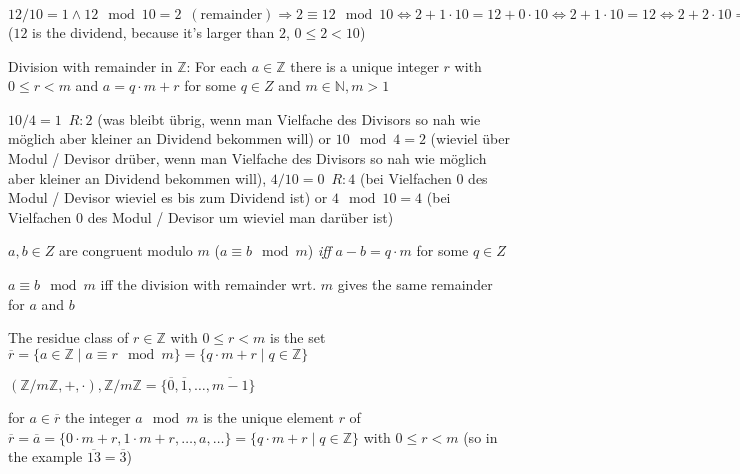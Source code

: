 \documentclass[landscape, a4paper]{article}
\begin{document}
\begin{minipage}[t]{0.2\linewidth}
	\begin{betterlist}
		\item $\boxed{12 / 10 = 1 \wedge 12 \mod 10 = 2 \enspace(\text{remainder})} \Rightarrow 2 \equiv 12 \mod 10 \Leftrightarrow 2 + 1 \cdot 10 = 12 + 0 \cdot 10 \Leftrightarrow \boxed{2 + 1 \cdot 10 = 12}\Leftrightarrow 2 + 2 \cdot 10 = 12 + 1 \cdot 10$ ($12$ is the dividend, because it's larger than $2$, $0\le 2< 10$)
		\item \alert{Division with remainder in $\mathbb{Z}$:} For each $a \in \mathbb{Z}$ there is a unique integer $r$ with $0 \le r < m$ and $a = q \cdot m + r$ for some $q \in Z$ and $m \in \mathbb{N}, m > 1$
		\begin{betterlist}
			\item $10 / 4 = 1\enspace R:2$ (was bleibt übrig, wenn man Vielfache des Divisors so nah wie möglich aber kleiner an Dividend bekommen will) or $10 \mod 4 = 2$ (wieviel über Modul / Devisor drüber, wenn man Vielfache des Divisors so nah wie möglich aber kleiner an Dividend bekommen will), $4 / 10 = 0\enspace R:4$ (bei Vielfachen $0$ des Modul / Devisor  wieviel es bis zum Dividend ist) or $4 \mod 10 = 4$ (bei Vielfachen $0$ des Modul / Devisor um wieviel man darüber ist)
		\end{betterlist}
		\item $a, b \in Z$ are \alert{congruent modulo} $m$ ($a \equiv b \mod m$) \textit{iff} $a - b = q \cdot m$ for some $q \in Z$
		\begin{betterlist}
			\item $a \equiv b \mod m$ iff the division with remainder wrt. $m$ gives the same remainder for $a$ and $b$
		\end{betterlist}
		\item The \alert{residue class} of $r \in \mathbb{Z}$ with $0 \le r < m$ is the set $\overline{r} = \{a \in \mathbb{Z} \mid a \equiv r \mod m\} = \{q \cdot m + r \mid q \in \mathbb{Z}\}$
		\begin{betterlist}
			\item $(\mathbb{Z}/m\mathbb{Z}, +, \cdot), \mathbb{Z}/m\mathbb{Z} = \{\overline{0}, \overline{1}, \ldots, \overline{m-1}\}$
			\item for $a \in \overline{r}$ the integer $a \mod m$ is the unique element $r$ of $\overline{r}=\overline{a}=\{0\cdot m + r, 1\cdot m + r, \ldots, a,\ldots\}=\{q\cdot m + r \mid q\in\mathbb{Z}\}$ with $0 \le r < m$ (so in the example $\overline{13} = \overline{3}$)

\end{betterlist}
\end{betterlist}
\end{minipage}
\end{document}
